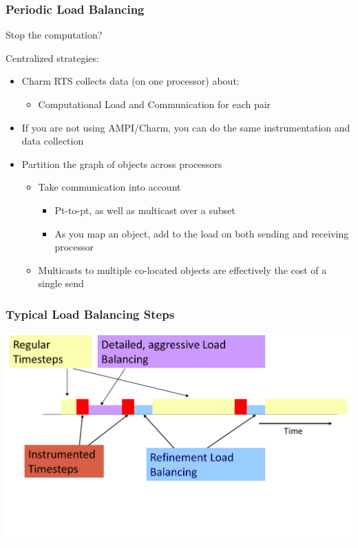 \begin{frame}[fragile]
\frametitle{Periodic Load Balancing}

Stop the computation?

Centralized strategies:
\begin{itemize}
 \item Charm RTS collects data (on one processor) about:
 \begin{itemize}
  \item Computational Load and Communication for each pair
 \end{itemize}
 \item If you are not using AMPI/Charm, you can do the same instrumentation and data collection
 \item Partition the graph of objects across processors
 \begin{itemize}
  \item Take communication into account
  \begin{itemize}
   \item Pt-to-pt, as well as multicast over a subset
   \item As you map an object, add to the load on both sending and receiving processor
  \end{itemize}
  \item Multicasts to multiple co-located objects are effectively the cost of a single send
 \end{itemize}
\end{itemize}
\end{frame}

\begin{frame}[fragile]
\frametitle{Typical Load Balancing Steps}
\begin{centering}
\includegraphics[width=1.0\textwidth]{figures/LBStepsDiagram}
\end{centering}
\end{frame}

